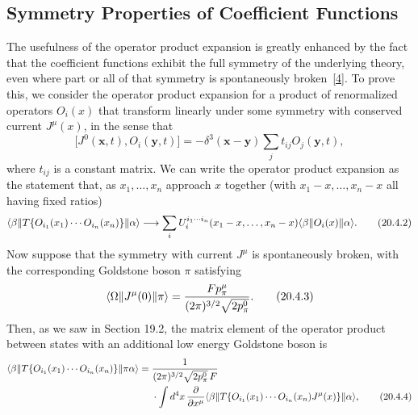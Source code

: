 
\subsection{Symmetry Properties of Coefficient Functions}

The usefulness of the operator product expansion is greatly enhanced by the fact that the coefficient functions exhibit the full symmetry of the underlying theory, even where part or all of that symmetry is spontaneously broken~\hyperref[ch20-ref-4]{[4]}. To prove this, we consider the operator product expansion for a product of renormalized operators $O_i(x)$ that transform linearly under some symmetry with conserved current $J^\mu(x)$, in the sense that
\begin{equation}
\bigl[J^0(\mathbf{x},t),O_i(\mathbf{y},t)\bigr]
=-\delta^3(\mathbf{x}-\mathbf{y})\sum_j t_{ij}O_j(\mathbf{y},t),
\tag{20.4.1}\label{eq:20.4.1}
\end{equation}
where $t_{ij}$ is a constant matrix. We can write the operator product expansion as the statement that, as $x_1,\ldots,x_n$ approach $x$ together (with $x_1-x,\ldots,x_n-x$ all having fixed ratios)
\begin{equation}
\langle \beta\rVert T\{O_{i_1}(x_1)\cdots O_{i_n}(x_n)\}\lVert \alpha\rangle
\longrightarrow
\sum_i U_i^{i_1\cdots i_n}(x_1-x,\ldots,x_n-x)
\langle \beta\rVert O_i(x)\lVert \alpha\rangle.
\tag{20.4.2}\label{eq:20.4.2}
\end{equation}
Now suppose that the symmetry with current $J^\mu$ is spontaneously broken, with the corresponding Goldstone boson $\pi$ satisfying
\begin{equation}
\langle \Omega\rVert J^\mu(0)\lVert \pi\rangle
=\frac{Fp_\pi^\mu}{(2\pi)^{3/2}\sqrt{2p_\pi^0}}.
\tag{20.4.3}\label{eq:20.4.3}
\end{equation}
Then, as we saw in Section 19.2, the matrix element of the operator product between states with an additional low energy Goldstone boson is
\begin{align}
\langle \beta\rVert T\{O_{i_1}(x_1)\cdots O_{i_n}(x_n)\}\lVert \pi\alpha\rangle
={}&
\frac{1}{(2\pi)^{3/2}\sqrt{2p_\pi^0}\,F}
\notag\\
&\cdot\int d^4x\,\frac{\partial}{\partial x^\mu}
\langle \beta\rVert T\{O_{i_1}(x_1)\cdots O_{i_n}(x_n)J^\mu(x)\}\lVert \alpha\rangle,
\tag{20.4.4}\label{eq:20.4.4}
\end{align}
